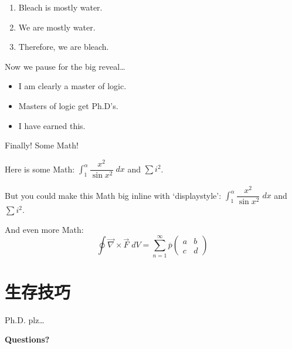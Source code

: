 \documentclass{beamer}	%
\newcommand{\ds}{\displaystyle}
\newcommand{\ov}[1]{\overline{#1}}
\newcommand{\twomatrix}[4]{\begin{pmatrix} #1 & #2 \\ #3 & #4 \end{pmatrix}}
\theoremstyle{plain}
\theoremstyle{definition}
\theoremstyle{remark}
\numberwithin{equation}{section}
\begin{document}
\begin{frame}
	\begin{enumerate}[1.]
	\item Bleach is mostly water. \pause
	\item We are mostly water. \pause
	\item Therefore, we are bleach.
	\end{enumerate} \vspace{0.5cm}

Now we pause for the big reveal\dots \pause \vspace{0.3cm}

	\begin{itemize}
	\item I am clearly a master of logic.
	\item Masters of logic get Ph.D's.
	\item I have earned this.
	\end{itemize}
\end{frame}



\begin{frame}
Finally! Some Math! \vspace{1cm}

Here is some Math: $\int_1^\alpha \dfrac{x^2}{\sin x^2} \;dx$ and $\sum i^2$. \vspace{1cm}

But you could make this Math big inline with `displaystyle': $\ds \int_1^\alpha \dfrac{x^2}{\sin x^2} \;dx$ and $\ds \sum i^2$. \vspace{1cm}

And even more Math:
	\[
	\oint \vec{\nabla} \times \vec{F} \;dV = \sum_{n=1}^\infty \ov{p} \twomatrix{a}{b}{c}{d}
	\]
\end{frame}



\section{生存技巧}



\begin{frame}
Ph.D. plz\dots
\end{frame}



\begin{frame}
\begin{center} {\bfseries \Large Questions?} \end{center}
\end{frame}
\end{document}
